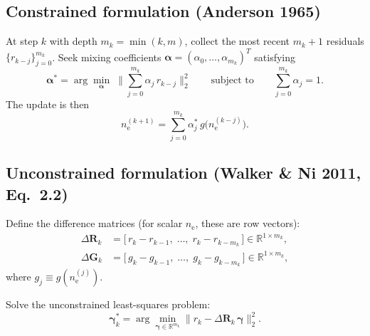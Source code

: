 \documentclass[11pt]{article}
\newcommand{\ne}{n_\mathrm{e}}
\newcommand{\bfalpha}{\boldsymbol{\alpha}}
\newcommand{\bgamma}{\boldsymbol{\gamma}}
\newcommand{\DR}{\Delta\mathbf{R}}
\newcommand{\DG}{\Delta\mathbf{G}}
\begin{document}
\subsection{Constrained formulation (Anderson 1965)}

At step $k$ with depth $m_k = \min(k, m)$, collect the most recent
$m_k + 1$ residuals $\{r_{k-j}\}_{j=0}^{m_k}$.  Seek mixing
coefficients $\bfalpha = (\alpha_0, \ldots, \alpha_{m_k})^T$ satisfying
%
\begin{equation}
  \label{eq:constrained-aa}
  \bfalpha^*
  = \arg\min_{\bfalpha}\;
    \biggl\|\sum_{j=0}^{m_k} \alpha_j\,r_{k-j}\biggr\|_2^2
  \qquad\text{subject to}\qquad
  \sum_{j=0}^{m_k} \alpha_j = 1.
\end{equation}
%
The update is then
%
\begin{equation}
  \label{eq:constrained-update}
  \ne^{(k+1)} = \sum_{j=0}^{m_k} \alpha_j^*\,g\bigl(\ne^{(k-j)}\bigr).
\end{equation}
%

\subsection{Unconstrained formulation (Walker \& Ni 2011, Eq.~2.2)}
\label{sec:unconstrained}

Define the difference matrices (for scalar $\ne$, these are row vectors):
%
\begin{align}
  \DR_k &= \bigl[\,r_k - r_{k-1},\;\ldots,\;r_k - r_{k-m_k}\,\bigr]
           \in \mathbb{R}^{1 \times m_k},
  \label{eq:DeltaR}\\
  \DG_k &= \bigl[\,g_k - g_{k-1},\;\ldots,\;g_k - g_{k-m_k}\,\bigr]
           \in \mathbb{R}^{1 \times m_k},
  \label{eq:DeltaG}
\end{align}
%
where $g_j \equiv g(\ne^{(j)})$.

Solve the unconstrained least-squares problem:
%
\begin{equation}
  \label{eq:ls-gamma}
  \bgamma_k^* = \arg\min_{\bgamma \in \mathbb{R}^{m_k}}
  \bigl\|r_k - \DR_k\,\bgamma\bigr\|_2^2.
\end{equation}
%
\end{document}
